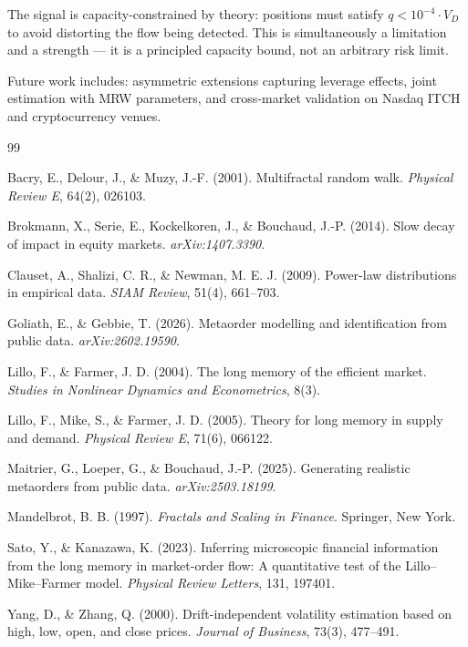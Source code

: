 \documentclass[12pt,a4paper]{article}
\begin{document}
The signal is capacity-constrained by theory: positions must satisfy
$q < 10^{-4} \cdot V_D$ to avoid distorting the flow being detected. This
is simultaneously a limitation and a strength --- it is a principled capacity
bound, not an arbitrary risk limit.

Future work includes: asymmetric extensions capturing leverage effects,
joint estimation with MRW parameters, and cross-market validation on Nasdaq
ITCH and cryptocurrency venues.


\begin{thebibliography}{99}

Bacry, E., Delour, J., \& Muzy, J.-F. (2001).
Multifractal random walk.
\textit{Physical Review E}, 64(2), 026103.

Brokmann, X., Serie, E., Kockelkoren, J., \& Bouchaud, J.-P. (2014).
Slow decay of impact in equity markets.
\textit{arXiv:1407.3390}.

Clauset, A., Shalizi, C. R., \& Newman, M. E. J. (2009).
Power-law distributions in empirical data.
\textit{SIAM Review}, 51(4), 661--703.

Goliath, E., \& Gebbie, T. (2026).
Metaorder modelling and identification from public data.
\textit{arXiv:2602.19590}.

Lillo, F., \& Farmer, J. D. (2004).
The long memory of the efficient market.
\textit{Studies in Nonlinear Dynamics and Econometrics}, 8(3).

Lillo, F., Mike, S., \& Farmer, J. D. (2005).
Theory for long memory in supply and demand.
\textit{Physical Review E}, 71(6), 066122.

Maitrier, G., Loeper, G., \& Bouchaud, J.-P. (2025).
Generating realistic metaorders from public data.
\textit{arXiv:2503.18199}.

Mandelbrot, B. B. (1997).
\textit{Fractals and Scaling in Finance}.
Springer, New York.

Sato, Y., \& Kanazawa, K. (2023).
Inferring microscopic financial information from the long memory in
market-order flow: A quantitative test of the Lillo--Mike--Farmer model.
\textit{Physical Review Letters}, 131, 197401.

Yang, D., \& Zhang, Q. (2000).
Drift-independent volatility estimation based on high, low, open, and close
prices.
\textit{Journal of Business}, 73(3), 477--491.

\end{thebibliography}
\end{document}
